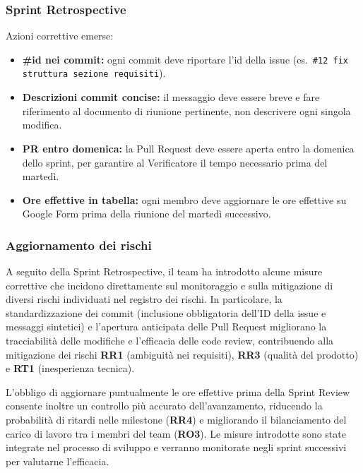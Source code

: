 \subsubsection{Sprint Retrospective}
Azioni correttive emerse:
\begin{itemize}
    \item \textbf{\#id nei commit:} ogni commit deve riportare l'id della issue
          (es.\ \texttt{\#12 fix struttura sezione requisiti}).
    \item \textbf{Descrizioni commit concise:} il messaggio deve essere breve e
          fare riferimento al documento di riunione pertinente, non descrivere
          ogni singola modifica.
    \item \textbf{PR entro domenica:} la Pull Request deve essere aperta entro la
          domenica dello sprint, per garantire al Verificatore il tempo necessario
          prima del martedì.
    \item \textbf{Ore effettive in tabella:} ogni membro deve aggiornare le ore
          effettive su Google Form prima della riunione del martedì successivo.
\end{itemize}

\subsubsection{Aggiornamento dei rischi}
A seguito della Sprint Retrospective, il team ha introdotto alcune misure correttive che incidono 
direttamente sul monitoraggio e sulla mitigazione di diversi rischi individuati nel registro dei rischi. 
In particolare, la standardizzazione dei commit (inclusione obbligatoria dell’ID della issue e messaggi sintetici) 
e l’apertura anticipata delle Pull Request migliorano la tracciabilità delle modifiche e l’efficacia delle 
code review, contribuendo alla mitigazione dei rischi \textbf{RR1} (ambiguità nei requisiti), \textbf{RR3} (qualità del prodotto) e \textbf{RT1} (inesperienza tecnica). 

L’obbligo di aggiornare puntualmente le ore effettive prima della Sprint Review consente inoltre un 
controllo più accurato dell’avanzamento, riducendo la probabilità di ritardi nelle milestone (\textbf{RR4}) e
migliorando il bilanciamento del carico di lavoro tra i membri del team (\textbf{RO3}). Le misure introdotte sono 
state integrate nel processo di sviluppo e verranno monitorate negli sprint successivi per valutarne l’efficacia.

